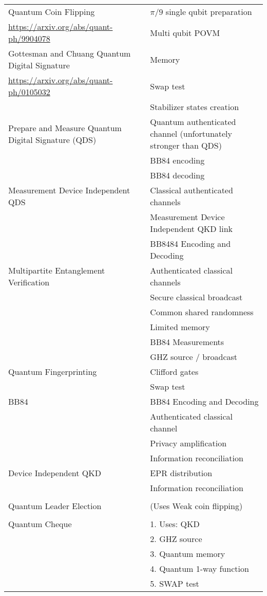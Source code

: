 \documentclass[11pt]{article}
\begin{document}
\begin{center}
\begin{tabular}{ll}
\hline
Quantum Coin Flipping & \(\pi/9\) single qubit preparation\\
\url{https://arxiv.org/abs/quant-ph/9904078} & Multi qubit POVM\\
\hline
Gottesman and Chuang Quantum Digital Signature & Memory\\
\url{https://arxiv.org/abs/quant-ph/0105032} & Swap test\\
 & Stabilizer states creation\\
\hline
Prepare and Measure Quantum Digital Signature (QDS) & Quantum authenticated channel (unfortunately stronger than QDS)\\
 & BB84 encoding\\
 & BB84 decoding\\
\hline
Measurement Device Independent QDS & Classical authenticated channels\\
 & Measurement Device Independent QKD link\\
 & BB8484 Encoding and Decoding\\
\hline
Multipartite Entanglement Verification & Authenticated classical channels\\
 & Secure classical broadcast\\
 & Common shared randomness\\
 & Limited memory\\
 & BB84 Measurements\\
 & GHZ source / broadcast\\
\hline
Quantum Fingerprinting & Clifford gates\\
 & Swap test\\
\hline
BB84 & BB84 Encoding and Decoding\\
 & Authenticated classical channel\\
 & Privacy amplification\\
 & Information reconciliation\\
\hline
Device Independent QKD & EPR distribution\\
 & Information reconciliation\\
 & \\
\hline
Quantum Leader Election & (Uses Weak coin flipping)\\
 & \\
\hline
Quantum Cheque & 1. Uses: QKD\\
 & 2. GHZ source\\
 & 3. Quantum memory\\
 & 4. Quantum 1-way function\\
 & 5. SWAP test\\

\end{tabular}
\end{center}
\end{document}
